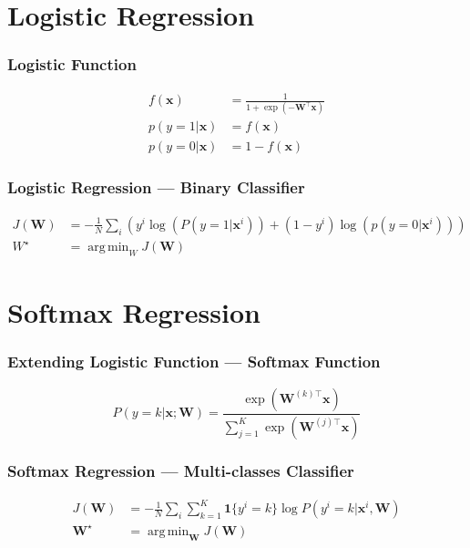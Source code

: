 \documentclass{beamer}
\DeclareMathOperator*{\argmin}{arg\,min}
\begin{document}
\section{Logistic Regression}

\begin{frame}
  \frametitle{Logistic Function}

  \begin{align*}
    f(\mathbf{x})&=\frac{1}{1+\exp(-\mathbf{W}^{\top}\mathbf{x})} \\
    p(y=1|\mathbf{x})&=f(\mathbf{x})\\
    p(y=0|\mathbf{x})&=1-f(\mathbf{x})
  \end{align*}
\end{frame}

\begin{frame}
  \frametitle{Logistic Regression --- Binary Classifier}

  \begin{align*}
    J(\mathbf{W})&=-\frac{1}{N}\sum_{i}\left(y^{i}\log(P(y=1|\mathbf{x}^{i}))+(1-y^{i})\log(p(y=0|\mathbf{x}^{i}))\right) \\
    W^{\star}&=\argmin_{W}J(\mathbf{W})
  \end{align*}
\end{frame}

\section{Softmax Regression}

\begin{frame}
  \frametitle{Extending Logistic Function --- Softmax Function}

  \begin{equation*}
    P(y=k|\mathbf{x}; \mathbf{W})=\frac{\exp(\mathbf{W}^{(k)\top}\mathbf{x})}{\sum_{j=1}^{K}\exp(\mathbf{W}^{(j)\top}\mathbf{x})}
  \end{equation*}
\end{frame}

\begin{frame}
  \frametitle{Softmax Regression --- Multi-classes Classifier}

  \begin{align*}
      J(\mathbf{W})&=-\frac{1}{N}\sum_{i}\sum_{k=1}^{K}\mathbf{1}\{y^{i}=k\}\log P(y^{i}=k|\mathbf{x}^{i}, \mathbf{W}) \\
      \mathbf{W}^{\star}&=\argmin_{\mathbf{W}}J(\mathbf{W})
  \end{align*}
\end{frame}
\end{document}
